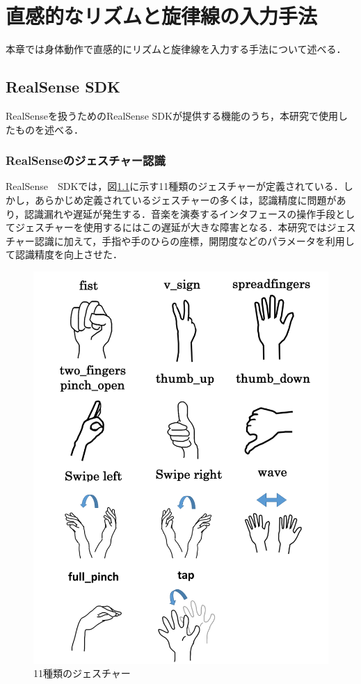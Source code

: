 \chapter{直感的なリズムと旋律線の入力手法}
本章では身体動作で直感的にリズムと旋律線を入力する手法について述べる．

\section{RealSense SDK}
RealSenseを扱うためのRealSense SDKが提供する機能のうち，本研究で使用したものを述べる．
\subsection{RealSenseのジェスチャー認識}
RealSense　SDKでは，図\ref{img:jesture}に示す11種類のジェスチャーが定義されている．しかし，あらかじめ定義されているジェスチャーの多くは，認識精度に問題があり，認識漏れや遅延が発生する．音楽を演奏するインタフェースの操作手段としてジェスチャーを使用するにはこの遅延が大きな障害となる．本研究ではジェスチャー認識に加えて，手指や手のひらの座標，開閉度などのパラメータを利用して認識精度を向上させた．
\begin{figure}[t]
	\begin{center}
		\includegraphics[width=0.9\linewidth]{./pics/03/jesture.png}
		\caption{11種類のジェスチャー}
		\label{img:jesture} 
	\end{center}
\end{figure}

